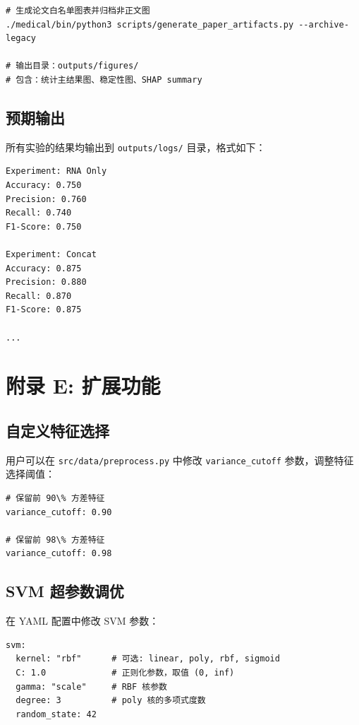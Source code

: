 \begin{verbatim}
# 生成论文白名单图表并归档非正文图
./medical/bin/python3 scripts/generate_paper_artifacts.py --archive-legacy

# 输出目录：outputs/figures/
# 包含：统计主结果图、稳定性图、SHAP summary
\end{verbatim}

\subsection*{预期输出}

所有实验的结果均输出到 \texttt{outputs/logs/} 目录，格式如下：

\begin{verbatim}
Experiment: RNA Only
Accuracy: 0.750
Precision: 0.760
Recall: 0.740
F1-Score: 0.750

Experiment: Concat
Accuracy: 0.875
Precision: 0.880
Recall: 0.870
F1-Score: 0.875

...
\end{verbatim}

\section*{附录 E: 扩展功能}

\subsection*{自定义特征选择}

用户可以在 \texttt{src/data/preprocess.py} 中修改 \texttt{variance\_cutoff} 参数，调整特征选择阈值：

\begin{verbatim}
# 保留前 90\% 方差特征
variance_cutoff: 0.90

# 保留前 98\% 方差特征
variance_cutoff: 0.98
\end{verbatim}

\subsection*{SVM 超参数调优}

在 YAML 配置中修改 SVM 参数：

\begin{verbatim}
svm:
  kernel: "rbf"      # 可选: linear, poly, rbf, sigmoid
  C: 1.0             # 正则化参数，取值 (0, inf)
  gamma: "scale"     # RBF 核参数
  degree: 3          # poly 核的多项式度数
  random_state: 42
\end{verbatim}

